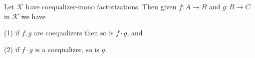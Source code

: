 Let $\mathcal{K}$ have coequalizer-mono factorizations. Then given $f: A \rightarrow B$ and $g: B \rightarrow C$ in $\mathcal{K}$ we have

(1) if $f, g$ are coequalizers then so is $f \cdot g$, and

(2) if $f \cdot g$ is a coequalizer, so is $g$.
